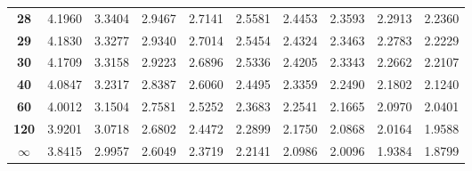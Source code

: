 \begin{center}
\begin{tabular}{c|c|c|c|c|c|c|c|c|c}
\textbf{28}  & 4.1960     & 3.3404     & 2.9467     & 2.7141     & 2.5581     & 2.4453     & 2.3593     & 2.2913     & 2.2360           \\
\textbf{29}  & 4.1830     & 3.3277     & 2.9340     & 2.7014     & 2.5454     & 2.4324     & 2.3463     & 2.2783     & 2.2229          \\
\textbf{30}  & 4.1709     & 3.3158     & 2.9223     & 2.6896     & 2.5336     & 2.4205     & 2.3343     & 2.2662     & 2.2107        \\
\textbf{40}  & 4.0847     & 3.2317     & 2.8387     & 2.6060     & 2.4495     & 2.3359     & 2.2490     & 2.1802     & 2.1240         \\
\textbf{60}  & 4.0012     & 3.1504     & 2.7581     & 2.5252     & 2.3683     & 2.2541     & 2.1665     & 2.0970     & 2.0401       \\
\textbf{120} & 3.9201     & 3.0718     & 2.6802     & 2.4472     & 2.2899     & 2.1750     & 2.0868     & 2.0164     & 1.9588        \\
\textbf{$\infty$}   & 3.8415     & 2.9957     & 2.6049     & 2.3719     & 2.2141     & 2.0986     & 2.0096     & 1.9384     & 1.8799     \bstrut \\
\hline
\end{tabular}
\end{center}

\clearpage %